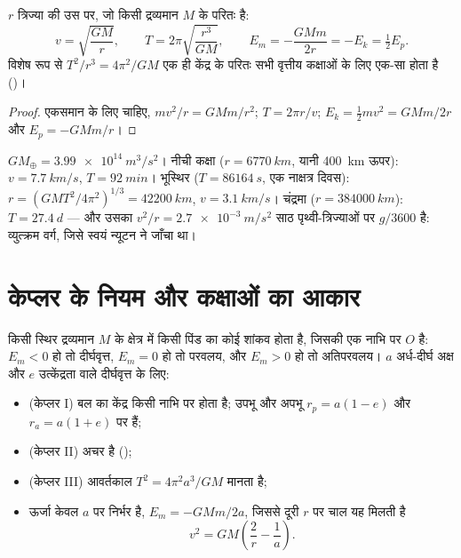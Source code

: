 \begin{theorem}[वृत्तीय कक्षाएँ]\label{thm:b1:central-forces:circular}
$r$ त्रिज्या की उस  पर, जो किसी द्रव्यमान $M$ के परितः है:
\[
v = \sqrt{\frac{GM}{r}}, \qquad
T = 2\pi\sqrt{\frac{r^3}{GM}}, \qquad
E_m = -\frac{GMm}{2r} = -E_k = \tfrac12 E_p .
\]
विशेष रूप से $T^2/r^3 = 4\pi^2/GM$ एक ही केंद्र के परितः सभी वृत्तीय
कक्षाओं के लिए एक-सा होता है ()।
\end{theorem}

\begin{proof}
एकसमान  के लिए  चाहिए, $mv^2/r = GMm/r^2$;
$T = 2\pi r/v$; $E_k = \tfrac12 mv^2 = GMm/2r$ और $E_p = -GMm/r$।
\end{proof}

\begin{example}[तीन कक्षाएँ]\label{ex:b1:central-forces:orbits}
$GM_\oplus = \qty{3.99e14}{m^3/s^2}$। नीची कक्षा ($r = \qty{6770}{km}$,
यानी \qty{400}{km} ऊपर): $v = \qty{7.7}{km/s}$, $T = \qty{92}{min}$। भूस्थिर
($T = \qty{86164}{s}$, एक नाक्षत्र दिवस): $r = (GMT^2/4\pi^2)^{1/3} =
\qty{42200}{km}$, $v = \qty{3.1}{km/s}$। चंद्रमा ($r = \qty{384000}{km}$):
$T = \qty{27.4}{d}$ --- और उसका  $v^2/r =
\qty{2.7e-3}{m/s^2}$ साठ पृथ्वी-त्रिज्याओं पर $g/3600$ है: व्युत्क्रम
वर्ग, जिसे स्वयं न्यूटन ने जाँचा था।
\end{example}

\section{केप्लर के नियम और कक्षाओं का आकार}

\begin{theorem}[न्यूटनी क्षेत्र में गतिपथ]\label{thm:b1:central-forces:conics}
किसी स्थिर द्रव्यमान $M$ के क्षेत्र में किसी पिंड का  कोई शांकव होता
है, जिसकी एक नाभि पर $O$ है: $E_m < 0$ हो तो दीर्घवृत्त, $E_m = 0$ हो तो
परवलय, और $E_m > 0$ हो तो अतिपरवलय। $a$ अर्ध-दीर्घ अक्ष और $e$ उत्केंद्रता
वाले दीर्घवृत्त के लिए:
\begin{itemize}
  \item (केप्लर I) बल का केंद्र किसी नाभि पर होता है; उपभू और अपभू
        $r_p = a(1 - e)$ और $r_a = a(1 + e)$ पर हैं;
  \item (केप्लर II)  अचर है ();
  \item (केप्लर III) आवर्तकाल $T^2 = 4\pi^2a^3/GM$ मानता है;
  \item ऊर्जा केवल $a$ पर निर्भर है, $E_m = -GMm/2a$, जिससे दूरी $r$ पर
        चाल यह मिलती है
        \[
        v^2 = GM\left(\frac{2}{r} - \frac{1}{a}\right) .
        \]
\end{itemize}
\end{theorem}
\admitted


